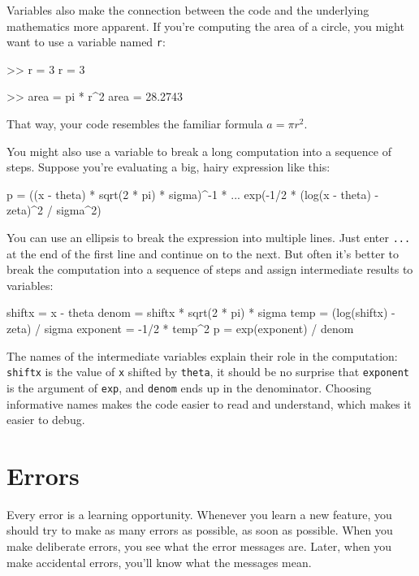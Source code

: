 Variables also make the connection between the code and the underlying
mathematics more apparent.  If you're computing the area of a circle,
you might want to use a variable named \lstinline{r}:

\begin{code}
>> r = 3
r = 3

>> area = pi * r^2
area = 28.2743
\end{code}

That way, your code resembles the familiar formula $a = \pi r^2$.

You might also use a variable to break a long computation into a sequence of steps.
Suppose you're evaluating a big, hairy expression like this:

\begin{code}
p = ((x - theta) * sqrt(2 * pi) * sigma)^-1 * ...
exp(-1/2 * (log(x - theta) - zeta)^2 / sigma^2)
\end{code}

You can use an ellipsis to break the expression into multiple lines.
Just enter \lstinline{...} at the end of the first line and continue on to the
next.
But often it's better to break the computation into a sequence of
steps and assign intermediate results to variables:

\begin{code}
shiftx = x - theta
denom = shiftx * sqrt(2 * pi) * sigma
temp = (log(shiftx) - zeta) / sigma
exponent = -1/2 * temp^2
p = exp(exponent) / denom
\end{code}

The names of the intermediate variables explain their role in the
computation:  \lstinline{shiftx} is the value of \lstinline{x} shifted by
\lstinline{theta},  it should be no surprise that \lstinline{exponent} is the argument of \lstinline{exp}, and \lstinline{denom} ends up in the denominator.  Choosing informative names makes the code easier to read and understand, which makes it easier to debug.



\section{Errors}


Every error is a learning opportunity.
Whenever you learn a new feature, you should try to make as many errors as possible, as soon as possible.
When you make deliberate errors, you see what the error messages are.
Later, when you make accidental errors, you'll know what the messages mean.

